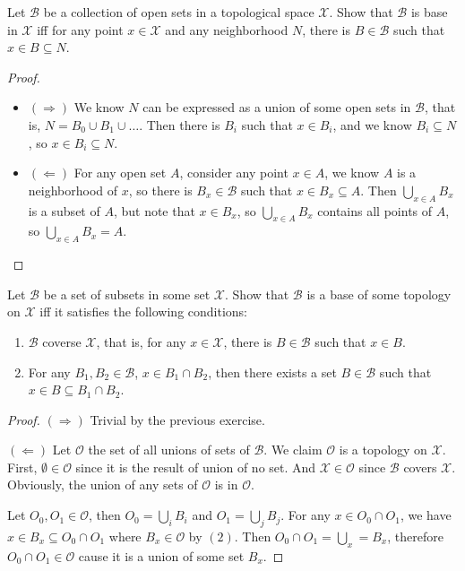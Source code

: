 \documentclass[./main.tex]{subfiles}
\begin{document}
\begin{exercise}
  Let $\mathscr{B}$ be a collection of open sets in a topological
  space $\mathcal{X}$. Show that $\mathscr{B}$ is base in $\mathcal{X}$
  iff for any point $x \in \mathcal{X}$ and any neighborhood $N$,
  there is $B \in \mathscr{B}$ such that $x \in B \subseteq N$.
\end{exercise}
\begin{proof}
  ~
  \begin{itemize}
    \item $(\Rightarrow)$ We know $N$ can be expressed as a union of
          some open sets in $\mathscr{B}$, that is, $N = B_0 \cup B_1 \cup \dots$.
          Then there is $B_i$ such that $x \in B_i$, and we know $B_i \subseteq N$,
          so $x \in B_i \subseteq N$.
    \item $(\Leftarrow)$ For any open set $A$, consider any point $x \in A$,
          we know $A$ is a neighborhood of $x$, so there is $B_x \in \mathscr{B}$
          such that $x \in B_x \subseteq A$. Then $\bigcup_{x \in A}B_x$
          is a subset of $A$, but note that $x \in B_x$, so 
          $\bigcup_{x \in A}B_x$ contains all points of $A$,
          so $\bigcup_{x \in A}B_x = A$.
  \end{itemize}
\end{proof}

\begin{theorem}
  Let $\mathscr{B}$ be a set of subsets in some set $\mathcal{X}$.
  Show that $\mathscr{B}$ is a base of some topology on $\mathcal{X}$ iff
  it satisfies the following conditions:
  \begin{enumerate}
    \item $\mathscr{B}$ coverse $\mathcal{X}$, that is, for any $x \in \mathcal{X}$,
          there is $B \in \mathscr{B}$ such that $x \in B$.
    \item For any $B_1, B_2\in \mathscr{B}$, $x \in B_1 \cap B_2$, then there exists
          a set $B \in \mathscr{B}$ such that $x \in B \subseteq B_1 \cap B_2$.
  \end{enumerate}
\end{theorem}
\begin{proof}
  $(\Rightarrow)$ Trivial by the previous exercise. \par
  $(\Leftarrow)$ Let $\mathscr{O}$ the set of all unions of sets of $\mathscr{B}$.
  We claim $\mathscr{O}$ is a topology on $\mathcal{X}$.
  First, $\emptyset \in \mathscr{O}$ since it is the result of union of no set.
  And $\mathcal{X} \in \mathscr{O}$ since $\mathscr{B}$ covers $\mathcal{X}$.
  Obviously, the union of any sets of $\mathscr{O}$ is in $\mathscr{O}$.

  Let $O_0, O_1 \in \mathscr{O}$, then $O_0 = \bigcup_i B_i$ and $O_1 = \bigcup_j B_j$.
  For any $x \in O_0 \cap O_1$, we have $x \in B_x \subseteq O_0 \cap O_1$ where $B_x \in \mathscr{O}$
  by $(2)$.
  Then $O_0 \cap O_1 = \bigcup_x = B_x$, therefore $O_0 \cap O_1 \in \mathscr{O}$
  cause it is a union of some set $B_x$.
\end{proof}
\end{document}
